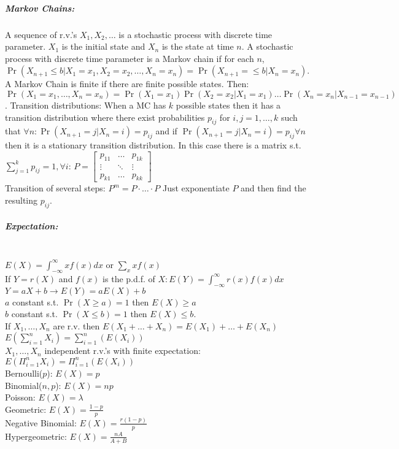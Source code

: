 \documentclass[landscape,10pt]{article}
\begin{document}
\begin{multicols}{4}
\subparagraph*{Markov Chains: }
A sequence of r.v.'s \(X_1, X_2, \ldots\) is a stochastic process with discrete time parameter. \(X_1\) is the initial state and \(X_n\) is the state at time \(n\). A stochastic process with discrete time parameter is a Markov chain if for each \(n\), \(\Pr(X_{n+1} \leq b | X_1 = x_1, X_2 = x_2, \ldots, X_n = x_n) = \Pr(X_{n+1} = \leq b | X_n = x_n)\). A Markov Chain is finite if there are finite possible states. Then: \(\Pr(X_1 = x_1, \ldots, X_n = x_n) = \Pr(X_1 = x_1) \Pr(X_2 = x_2 | X_1 = x_1) \ldots \Pr(X_n = x_n | X_{n-1} = x_{n-1}) \). Transition distributions: When a MC has \(k\) possible states then it has a transition distribution where there exist probabilities \(p_{ij}\) for \(i, j = 1, \ldots , k\) such that \(\forall n: \Pr(X_{n+1} = j | X_n = i) = p_{ij}\) and if \(\Pr(X_{n+1} = j | X_n = i) = p_{ij} \forall n\) then it is a stationary transition distribution. In this case there is a matrix s.t. \\ \(\sum\limits_{j=1}^{k}{p_{ij}}=1,  \forall i\):
\(P = \begin{bmatrix} 
        p_{11} & \hdots & p_{1k} \\
        \vdots & \ddots & \vdots \\
         p_{k1} & \hdots & p_{kk}
     \end{bmatrix}\)\\     
Transition of several steps: \(P^m = P \cdot \ldots \cdot P\) Just exponentiate \(P\) and then find the resulting \(p_{ij}\).

\subparagraph*{Expectation: } \ \ \\
\( E(X) = \int_{-\infty}^{\infty}{x f(x)dx}\) or \(\sum\limits_{x}xf(x)\) \\
If \(Y = r(X)\) and \(f(x)\) is the p.d.f. of \(X: E(Y) = \int_{-\infty}^{\infty}{r(x)f(x)dx}\) \\
\(Y = aX + b \rightarrow E(Y) = aE(X)+b\) \\
\(a\) constant s.t. \(\Pr(X \geq a) = 1\) then \(E(X) \geq a\) \\
\(b\) constant s.t. \(\Pr(X \leq b) = 1\) then \(E(X) \leq b\). \\
If \(X_1, \ldots, X_n \) are r.v. then \(E(X_1+\ldots+X_n) = E(X_1) + \ldots +E(X_n)\) \\
\(E\left( \sum_{i = 1}^{n}X_i \right) = \sum_{i = 1}^{n}(E(X_i))\) \\ 
\(X_1, \ldots, X_n\) independent r.v.'s with finite expectation: \(E\left(\Pi_{i=1}^{n}{X_i} \right) = \Pi_{i=1}^{n}\left(E(X_i)\right)\) \\
Bernoulli(\(p\)): \(E(X) = p\) \\ 
Binomial(\(n,p\)): \(E(X) = np\) \\
Poisson: \(E(X) = \lambda\) \\ 
Geometric: \(E(X) = \frac{1-p}{p}\) \\
Negative Binomial: \(E(X) = \frac{r(1-p)}{p}\) \\
Hypergeometric: \(E(X) = \frac{nA}{A+B}\)


\end{multicols}
\end{document}
